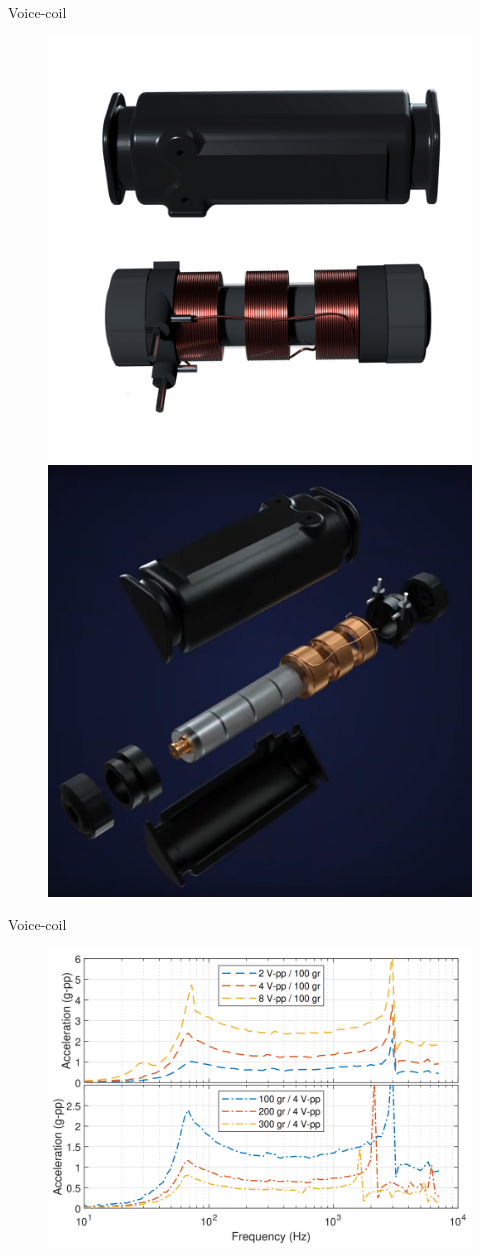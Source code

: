 {
\begin{frame}{Voice-coil}
\begin{figure}
\centering
\includegraphics[width=0.45\linewidth]{images/voice-coil_2}
\includegraphics[width=0.45\linewidth]{images/voice-coil}
\end{figure}
\end{frame}
}

{
\begin{frame}{Voice-coil}
\begin{figure}
\centering
\includegraphics[width=\linewidth]{images/voice-coil_bandwidth}
\end{figure}
\end{frame}
}


